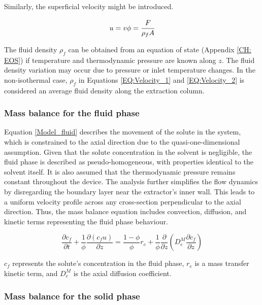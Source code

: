 \documentclass[../Article_Model_Parameters.tex]{subfiles}
\begin{document}
	Similarly, the superficial velocity might be introduced.
	
	{\footnotesize
		\begin{equation} \label{EQ:Velocity_2}
			u = v \phi = \cfrac{F}{\rho_f A }
		\end{equation}
	}
	
	The fluid density $\rho_f$ can be obtained from an equation of state (Appendix \ref{CH: EOS}) if temperature and thermodynamic pressure are known along $z$. The fluid density variation may occur due to pressure or inlet temperature changes. In the non-isothermal case, $\rho_f$ in Equations \ref{EQ:Velocity_1} and \ref{EQ:Velocity_2} is considered an average fluid density along the extraction column.
	
	\subsubsection{Mass balance for the fluid phase} \label{CH: Mass_balance_fluid}
	
	Equation \ref{Model_fluid} describes the movement of the solute in the system, which is constrained to the axial direction due to the quasi-one-dimensional assumption. Given that the solute concentration in the solvent is negligible, the fluid phase is described as pseudo-homogeneous, with properties identical to the solvent itself. It is also assumed that the thermodynamic pressure remains constant throughout the device. The analysis further simplifies the flow dynamics by disregarding the boundary layer near the extractor's inner wall. This leads to a uniform velocity profile across any cross-section perpendicular to the axial direction. Thus, the mass balance equation includes convection, diffusion, and kinetic terms representing the fluid phase behaviour.
	
	{\footnotesize
		\begin{equation}
			\label{Model_fluid}
			\frac{\partial c_f}{\partial t}
			+ \frac{1}{\phi} \frac{\partial \left( c_f u\right)}{\partial z}
			= \frac{1-\phi}{\phi} r_e
			+ \frac{1}{\phi} \frac{\partial}{\partial z} \left( D^M_e \frac{\partial c_f}{\partial z} \right)
		\end{equation}
	}
	
	$c_f$ represents the solute's concentration in the fluid phase, $r_e$ is a mass transfer kinetic term, and $D^M_e$ is the axial diffusion coefficient.
	
	\subsubsection{Mass balance for the solid phase} \label{Mass_balance_solid}
	
\end{document}
